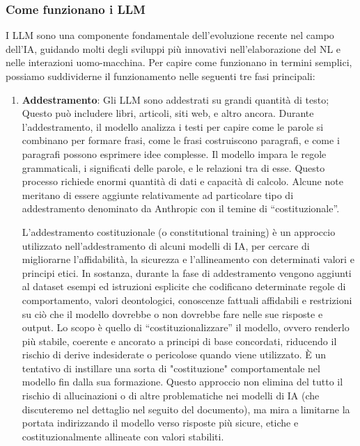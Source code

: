         \subsubsection{Come funzionano i LLM}
            I LLM sono una componente fondamentale dell'evoluzione recente nel campo dell'IA, guidando molti degli sviluppi più innovativi nell'elaborazione del NL e nelle interazioni uomo-macchina. Per capire come funzionano in termini semplici, possiamo suddividerne il funzionamento nelle seguenti tre fasi principali: 
            \begin{enumerate}
                \item
                    \textbf{Addestramento}: Gli LLM sono addestrati su grandi quantità di testo; Questo può includere libri, articoli, siti web, e altro ancora.  Durante l'addestramento, il modello analizza i testi per capire come le parole si combinano per formare frasi, come le frasi costruiscono paragrafi, e come i paragrafi possono esprimere idee complesse.  Il modello impara le regole grammaticali, i significati delle parole, e le relazioni tra di esse. Questo processo richiede enormi quantità di dati e capacità di calcolo. Alcune note meritano di essere aggiunte relativamente ad particolare tipo di addestramento denominato  da Anthropic con il temine di ``costituzionale''. 
            
                    L'addestramento costituzionale (o constitutional training) è un approccio utilizzato nell'addestramento di alcuni modelli di IA, per cercare di migliorarne l'affidabilità, la sicurezza e l'allineamento con determinati valori e principi etici. In sostanza, durante la fase di addestramento vengono aggiunti al dataset esempi ed istruzioni esplicite che codificano determinate regole di comportamento, valori deontologici, conoscenze fattuali affidabili e restrizioni su ciò che il modello dovrebbe o non dovrebbe fare nelle sue risposte e output. Lo scopo è quello di ``costituzionalizzare'' il modello, ovvero renderlo più stabile, coerente e ancorato a principi di base concordati, riducendo il rischio di derive indesiderate o pericolose quando viene utilizzato. È un tentativo di instillare una sorta di "costituzione" comportamentale nel modello fin dalla sua formazione. Questo approccio non elimina del tutto il rischio di allucinazioni o di altre problematiche nei modelli di IA (che discuteremo nel dettaglio nel seguito del documento), ma mira a limitarne la portata indirizzando il modello verso risposte più sicure, etiche e costituzionalmente allineate con valori stabiliti. 


\end{enumerate}

